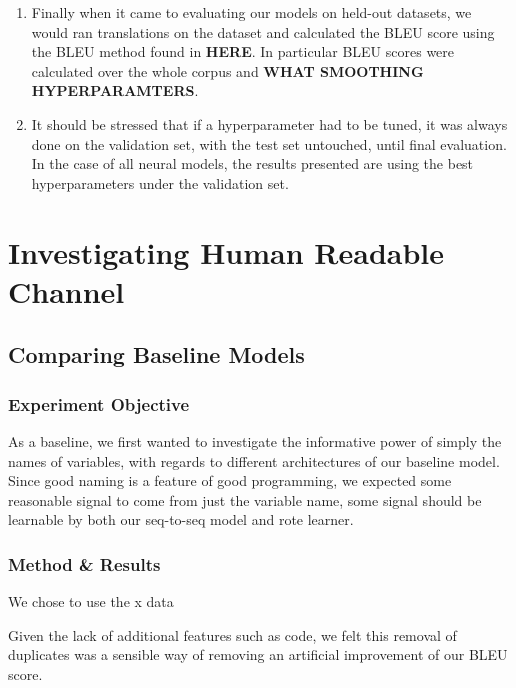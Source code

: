 \begin{enumerate}
    \item Finally when it came to evaluating our models on held-out datasets, we would ran translations on the dataset and calculated the BLEU score using the BLEU method found in \textbf{HERE}.
    In particular BLEU scores were calculated over the whole corpus and \textbf{WHAT SMOOTHING HYPERPARAMTERS}.
    \item It should be stressed that if a hyperparameter had to be tuned, it was always done on the validation set, with the test set untouched, until final evaluation. In the case of all neural models, the results presented are using the best hyperparameters under the validation set.

\end{enumerate}


\section{Investigating Human Readable Channel} %
\label{sec:investigating_human_readable_channel}

\subsection{Comparing Baseline Models} %
\label{sub:comparing_baseline_models}

\subsubsection{Experiment Objective} %

As a baseline, we first wanted to investigate the informative power of simply the names of variables, with regards to different architectures of our baseline model.
Since good naming is a feature of good programming, we expected some reasonable signal to come from just the variable name, some signal should be learnable by both our seq-to-seq model and rote learner.

\subsubsection{Method \& Results} %
We chose to use the x data

Given the lack of additional features such as code, we felt this removal of duplicates was a sensible way of removing an artificial improvement of our BLEU score. 

